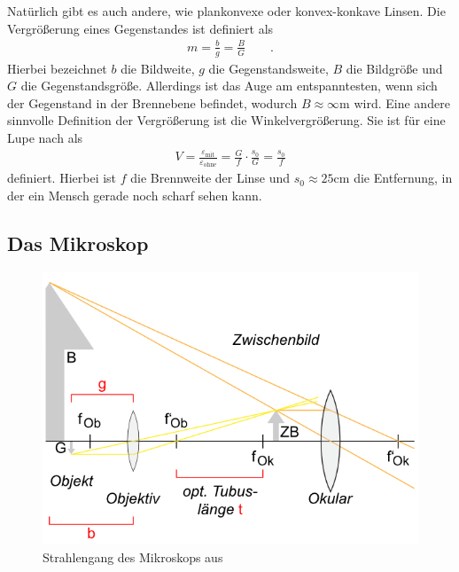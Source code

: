 \documentclass[12pt,a4paper,titlepage,headinclude,bibtotoc]{scrartcl}
\begin{document}
Natürlich gibt es auch andere, wie plankonvexe oder konvex-konkave Linsen.
Die Vergrößerung eines Gegenstandes ist definiert als 
\begin{align}
m=\frac{b}{g}=\frac{B}{G}\qquad .\label{eq:vergr}
\end{align}
Hierbei bezeichnet $b$ die Bildweite, $g$ die Gegenstandsweite, $B$ die Bildgröße und $G$ die Gegenstandsgröße.
Allerdings ist das Auge am entspanntesten, wenn sich der Gegenstand in der Brennebene befindet, wodurch $B\approx\infty \si\metre$ wird.
Eine andere sinnvolle Definition der Vergrößerung ist die Winkelvergrößerung.
Sie ist für eine Lupe nach \cite[S.362]{demtroeder2} als
\begin{align}
V=\frac{\varepsilon_\text{mit}}{\varepsilon_\text{ohne}}=\frac{G}{f}\cdot\frac{s_0}{G}=\frac{s_0}{f}\label{eq:winkelvergr}
\end{align}
definiert.
Hierbei ist $f$ die Brennweite der Linse und $s_0\approx 25\si{\centi\meter}$ die Entfernung, in der ein Mensch gerade noch scharf sehen kann.

\subsection{Das Mikroskop}
\begin{figure}[!h]
\centering
\includegraphics{MikroskopStrahlengang.png}
\caption{Strahlengang des Mikroskops aus \protect\cite[6.3.15, 13 Uhr]{lp18}}
\label{fig:microstrahl}
\end{figure}
\end{document}
